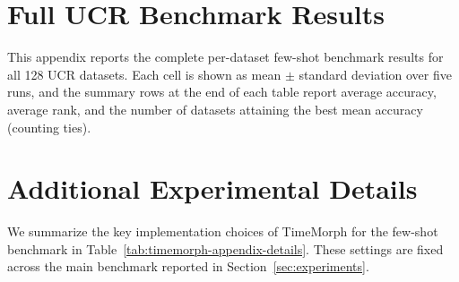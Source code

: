 \documentclass{article}
\begin{document}



\appendix

\section{Full UCR Benchmark Results}
\label{app:full-ucr-results}
This appendix reports the complete per-dataset few-shot benchmark results for all 128 UCR datasets. Each cell is shown as mean $\pm$ standard deviation over five runs, and the summary rows at the end of each table report average accuracy, average rank, and the number of datasets attaining the best mean accuracy (counting ties).


\clearpage

\clearpage

\clearpage


\clearpage

\section{Additional Experimental Details}
\label{app:details}
We summarize the key implementation choices of TimeMorph for the few-shot benchmark in Table~\ref{tab:timemorph-appendix-details}. These settings are fixed across the main benchmark reported in Section~\ref{sec:experiments}.
\end{document}
